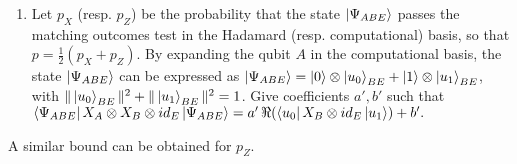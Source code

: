 \documentclass[12pt]{article}
\begin{document}
\begin{enumerate}
\begin{enumerate}
\item Let $p_X$ (resp. $p_Z$) be the probability that the state $\ket{\Psi_{ABE}}$ passes the matching outcomes test in the Hadamard (resp. computational) basis, so that $p=\frac{1}{2}(p_X+p_Z)$.
By expanding the qubit $A$ in the computational basis, the state $\ket{\Psi_{ABE}}$ can be expressed as $\ket{\Psi_{ABE}} = \ket{0}\otimes\ket{u_0}_{BE} + \ket{1}\otimes\ket{u_1}_{BE}$, with $\|\ket{u_0}_{BE}\|^2+\|\ket{u_1}_{BE}\|^2=1$. Give coefficients $a',b'$ such that
$ \bra{\Psi_{ABE}} X_A \otimes X_B \otimes id_E \ket{\Psi_{ABE}} = a'\, \Re(\bra{u_0} X_B \otimes id_E \ket{u_1}) + b'.$
\end{enumerate}
A similar bound can be obtained for $p_Z$.


\end{enumerate}
\end{document}
